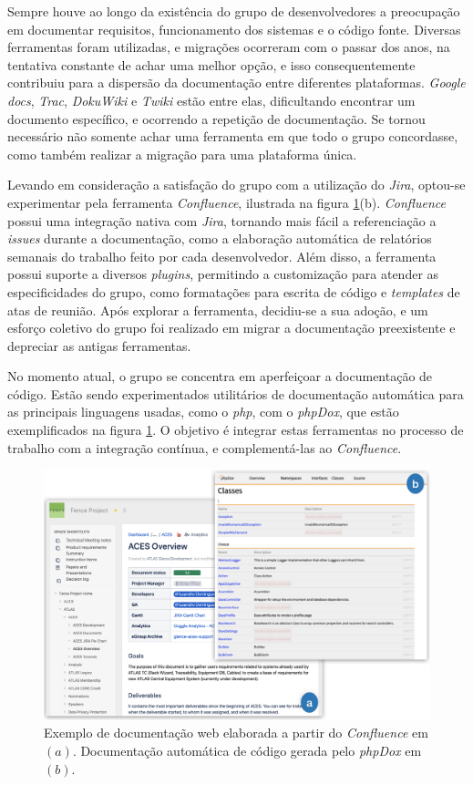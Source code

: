 Sempre houve ao longo da existência do grupo de desenvolvedores a preocupação em documentar requisitos, funcionamento dos sistemas e o código fonte. Diversas ferramentas foram utilizadas, e migrações ocorreram com o passar dos anos, na tentativa constante de achar uma melhor opção, e isso consequentemente contribuiu para a dispersão da documentação entre diferentes plataformas. \emph{Google docs}, \emph{Trac}, \emph{DokuWiki} e \emph{Twiki} estão entre elas, dificultando encontrar um documento específico, e ocorrendo a repetição de documentação. Se tornou necessário não somente achar uma ferramenta em que todo o grupo concordasse, como também realizar a migração para uma plataforma única.

Levando em consideração a satisfação do grupo com a utilização do \emph{Jira}, optou-se experimentar pela ferramenta \emph{Confluence}, ilustrada na figura \ref{fig:centralizacao-docs}(b). \emph{Confluence} possui uma integração nativa com \emph{Jira}, tornando mais fácil a referenciação a \emph{issues} durante a documentação, como a elaboração automática de relatórios semanais do trabalho feito por cada desenvolvedor. Além disso, a ferramenta possui suporte a diversos \emph{plugins}, permitindo a customização para atender as especificidades do grupo, como formatações para escrita de código e \emph{templates} de atas de reunião. Após explorar a ferramenta, decidiu-se a sua adoção, e um esforço coletivo do grupo foi realizado em migrar a documentação preexistente e depreciar as antigas ferramentas.

No momento atual, o grupo se concentra em aperfeiçoar a documentação de código. Estão sendo experimentados utilitários de documentação automática para as principais linguagens usadas, como o \emph{php}, com o \emph{phpDox}, que estão exemplificados na figura \ref{fig:centralizacao-docs}. O objetivo é integrar estas ferramentas no processo de trabalho com a integração contínua, e complementá-las ao \emph{Confluence}.

\begin{figure}[H]
    \centering
    \includegraphics[width=15cm]{source/4-solucao/images/centralizacao-docs.png}
    \caption{Exemplo de documentação web elaborada a partir do \emph{Confluence} em $(a)$. Documentação automática de código gerada pelo \emph{phpDox} em $(b)$.}
    \label{fig:centralizacao-docs}
\end{figure}

